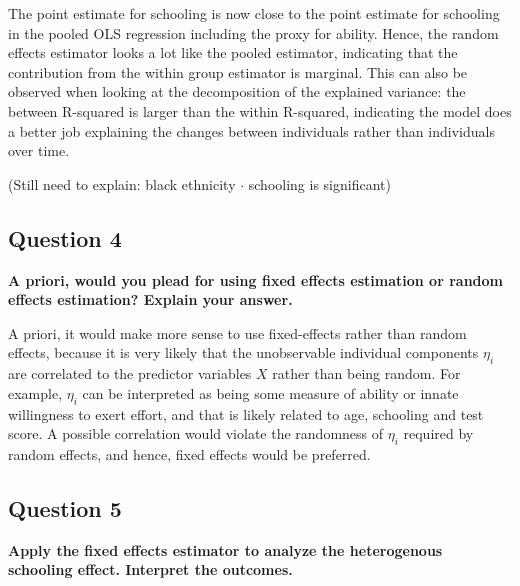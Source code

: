 \documentclass[
]{article}
\begin{document}
The point estimate for schooling is now close to the point estimate for
schooling in the pooled OLS regression including the proxy for ability.
Hence, the random effects estimator looks a lot like the pooled
estimator, indicating that the contribution from the within group
estimator is marginal. This can also be observed when looking at the
decomposition of the explained variance: the between R-squared is larger
than the within R-squared, indicating the model does a better job
explaining the changes between individuals rather than individuals over
time.

(Still need to explain: black ethnicity \(\cdot\) schooling is
significant)

\clearpage

\hypertarget{question-4}{%
\subsection{Question 4}\label{question-4}}

\textbf{A priori, would you plead for using fixed effects estimation or
random effects estimation? Explain your answer.}

A priori, it would make more sense to use fixed-effects rather than
random effects, because it is very likely that the unobservable
individual components \(\eta_i\) are correlated to the predictor
variables \(X\) rather than being random. For example, \(\eta_i\) can be
interpreted as being some measure of ability or innate willingness to
exert effort, and that is likely related to age, schooling and test
score. A possible correlation would violate the randomness of \(\eta_i\)
required by random effects, and hence, fixed effects would be preferred.

\clearpage

\hypertarget{question-5}{%
\subsection{Question 5}\label{question-5}}

\textbf{Apply the fixed effects estimator to analyze the heterogenous
schooling effect. Interpret the outcomes.}
\end{document}
